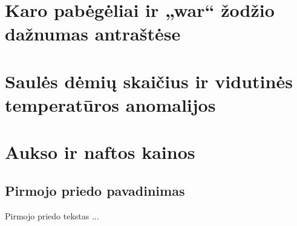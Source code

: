 \documentclass[a4paper,12pt,fleqn]{article}
\begin{document}
    {}{}{}{}%
    {}

    \tableofcontents

    


    \newpage
    \section{Karo pabėgėliai ir „war“ žodžio dažnumas antraštėse}
    \label{sec:refugees}
    

    \section{Saulės dėmių skaičius ir vidutinės temperatūros anomalijos}
    \label{sec:sunspots}
    

    \section{Aukso ir naftos kainos}
    \label{sec:oil-gold}
    


    





    \newpage
    \begin{appendices}
        \section{Pirmojo priedo pavadinimas}
        \label{app:a}
        Pirmojo priedo tekstas ...

    \end{appendices}
\end{document}
